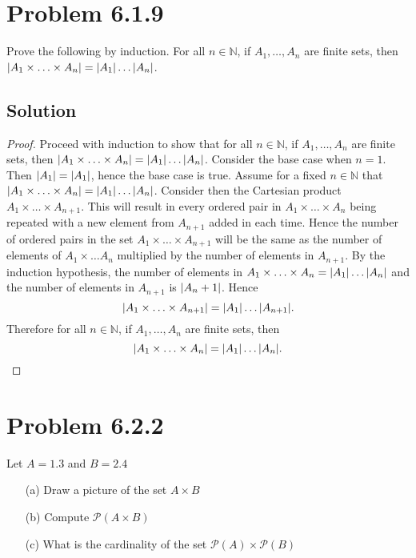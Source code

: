 \documentclass[12pt]{extarticle}
\newcommand{\powerset}[1]{\mathcal{P}(#1)}
\begin{document}
\section*{Problem 6.1.9}

Prove the following by induction. For all $n\in\mathbb{N}$, if $A_1, \ldots , A_n$ are finite sets, then $\qty|A_1 \times \ldots \times A_n| = \qty|A_1| \ldots \qty|A_n|$. 

\subsection*{Solution}

\begin{proof}
	Proceed with induction to show that for all $n\in\mathbb{N}$, if $A_1, \ldots , A_n$ are finite sets, then $\qty|A_1 \times \ldots \times A_n| = \qty|A_1| \ldots \qty|A_n|$. Consider the base case when $n = 1$. Then $\qty|A_1| = \qty|A_1|$, hence the base case is true. Assume for a fixed $n \in \mathbb{N}$ that $\qty|A_1 \times \ldots \times A_n| = \qty|A_1| \ldots \qty|A_n|$. Consider then the Cartesian product $A_1 \times \ldots \times A_{n+1}$. This will result in every ordered pair in $A_1 \times \ldots \times A_n$ being repeated with a new element from $A_{n+1}$ added in each time. Hence the number of ordered pairs in the set $A_1 \times \ldots \times A_{n+1}$ will be the same as the number of elements of $A_1 \times \ldots A_n$ multiplied by the number of elements in $A_{n+1}$. By the induction hypothesis, the number of elements in $A_1 \times \ldots \times A_n = \qty|A_1| \ldots \qty|A_n|$ and the number of elements in $A_{n+1}$ is $\qty|A_n+1|$. Hence
	\[
		\qty|A_1 \times \ldots \times A_{n+1}| = \qty|A_1| \ldots \qty|A_{n+1}|
	.\]
	Therefore for all $n\in\mathbb{N}$, if $A_1, \ldots , A_n$ are finite sets, then 
	\[
		\qty|A_1 \times \ldots \times A_n| = \qty|A_1| \ldots \qty|A_n|
	.\]
\end{proof}

\section*{Problem 6.2.2}

Let $A = \qty{1,3}$ and $B = \qty{2,4}$

\begin{enumerate}
	\item[(a)] Draw a picture of the set $A \times B$
	\item[(b)] Compute $\powerset{A \times B}$
	\item[(c)] What is the cardinality of the set $\powerset{A} \times \powerset{B}$
\end{enumerate}
\end{document}
